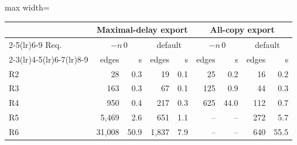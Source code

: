 \begin{adjustbox}{max width=\textwidth}\begin{tabular}{@{}lrrrrrrrr@{}}
\toprule
 & \multicolumn{4}{c}{Maximal-delay export} & \multicolumn{4}{c}{All-copy export} \\
\cmidrule(lr){2-5}\cmidrule(lr){6-9}
Req. & \multicolumn{2}{c}{$-n\,0$} & \multicolumn{2}{c}{default} & \multicolumn{2}{c}{$-n\,0$} & \multicolumn{2}{c}{default} \\
\cmidrule(lr){2-3}\cmidrule(lr){4-5}\cmidrule(lr){6-7}\cmidrule(lr){8-9}
 & edges & s & edges & s & edges & s & edges & s \\
\midrule
R2 & 28 & 0.3 & 19 & 0.1 & 25 & 0.2 & 16 & 0.2 \\
R3 & 163 & 0.3 & 67 & 0.1 & 125 & 0.9 & 44 & 0.3 \\
R4 & 950 & 0.4 & 217 & 0.3 & 625 & 44.0 & 112 & 0.7 \\
R5 & 5{,}469 & 2.6 & 651 & 1.1 & -- & -- & 272 & 5.7 \\
R6 & 31{,}008 & 50.9 & 1{,}837 & 7.9 & -- & -- & 640 & 55.5 \\
\bottomrule
\end{tabular}\end{adjustbox}
